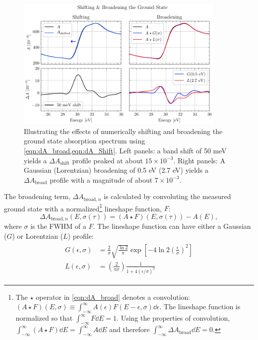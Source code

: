 \begin{figure}
	\centering
	\includegraphics[width=0.9\textwidth]{figures/chap4/Shift_Broad_Example.pdf}
	\caption{Illustrating the effects of numerically shifting and broadening the ground state absorption spectrum using \cref{eqn:dA_broad,eqn:dA_Shift}. Left panels: a band shift of 50 meV yields a $\Delta A_{\textrm{shift}}$ profile peaked at about $15 \times 10^{-3}$. Right panels: A Gaussian (Lorentzian) broadening of 0.5 eV (2.7 eV) yields a $\Delta A_{\textrm{broad}}$ profile with a magnitude of about $7 \times 10^{-3}$.}
	\label{fig:Shift_Broad_Example}
\end{figure}

The broadening term, $\Delta A_{\textrm{broad},n}$ is calculated by convoluting the measured ground state with a normalized\footnote{The $\star$ operator in \cref{eqn:dA_broad} denotes a convolution: $(A \star F)(E, \sigma) \equiv \int_{-\infty}^{\infty} A(\epsilon) F(E-\epsilon, \sigma) \dd{\epsilon}$. The lineshape function is normalized so that $\int_{-\infty}^{\infty} F \dd{E} = 1$. Using the properties of convolution, ${\int_{-\infty}^{\infty} (A \star F) \dd{E} =  \int_{-\infty}^{\infty} A \dd{E}}$ and therefore $\int_{-\infty}^{\infty} \Delta A_{\textrm{broad}} \dd{E}=0$.} lineshape function, $F$:
\begin{equation}
\Delta A_{\textrm{broad},n}(E, \sigma(\tau)) = (A \star F) (E, \sigma(\tau)) - A(E),
\label{eqn:dA_broad}
\end{equation}
where $\sigma$ is the FWHM of a $F$. The lineshape function can have either a Gaussian ($G$) or Lorentzian ($L$) profile:
\begin{align}
\begin{split}
G(\epsilon, \sigma) &=  \frac{2}{\sigma} \sqrt{\frac{\ln 2}{\pi}} \exp \left[ - 4 \ln 2 \left( \frac{\epsilon}{\sigma}\right)^2 \right]  \\
L(\epsilon, \sigma) &= \left(\frac{2}{\pi \sigma}\right) \frac{1}{1 + 4 \left(\epsilon/\sigma\right)^2}
\end{split}
\end{align}

